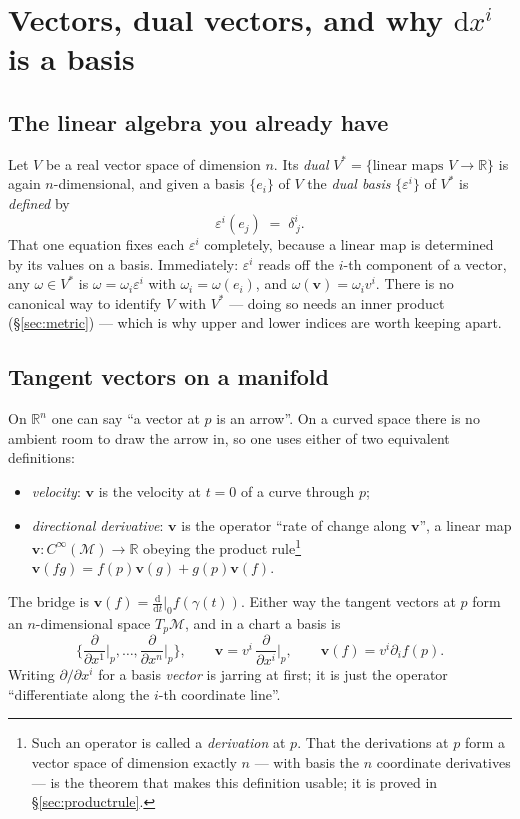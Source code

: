 \documentclass[10pt,a4paper]{article}
\newcommand{\dd}{\mathrm{d}}
\newcommand{\R}{\mathbb{R}}
\newcommand{\M}{\mathcal{M}}
\newcommand{\pdi}[1]{\frac{\partial}{\partial #1}}
\newcommand{\vv}{\mathbf{v}}
\theoremstyle{plain}
\theoremstyle{definition}
\numberwithin{equation}{section}
\begin{document}
\section{Vectors, dual vectors, and why $\dd x^i$ is a basis}
\label{sec:dual}

\subsection{The linear algebra you already have}

Let $V$ be a real vector space of dimension $n$. Its \emph{dual}
$V^*=\{\text{linear maps }V\to\R\}$ is again $n$-dimensional, and given a basis $\{e_i\}$ of
$V$ the \emph{dual basis} $\{\varepsilon^i\}$ of $V^*$ is \emph{defined} by
\begin{equation}
\varepsilon^i(e_j)\;=\;\delta^i_{\,j}.
\label{eq:dualbasis}
\end{equation}
That one equation fixes each $\varepsilon^i$ completely, because a linear map is determined by
its values on a basis. Immediately: $\varepsilon^i$ reads off the $i$-th component of a vector,
any $\omega\in V^*$ is $\omega=\omega_i\varepsilon^i$ with $\omega_i=\omega(e_i)$, and
$\omega(\vv)=\omega_iv^i$. There is no canonical way to identify $V$ with $V^*$ --- doing so
needs an inner product (\S\ref{sec:metric}) --- which is why upper and lower indices are worth
keeping apart.

\subsection{Tangent vectors on a manifold}

On $\R^n$ one can say ``a vector at $p$ is an arrow''. On a curved space there is no ambient
room to draw the arrow in, so one uses either of two equivalent definitions:
\begin{itemize}[leftmargin=1.3em,itemsep=1pt]
\item \emph{velocity}: $\vv$ is the velocity at $t=0$ of a curve through $p$;
\item \emph{directional derivative}: $\vv$ is the operator ``rate of change along $\vv$'',
      a linear map $\vv:C^\infty(\M)\to\R$ obeying the product
      rule\footnote{Such an operator is called a \emph{derivation} at $p$. That the derivations
      at $p$ form a vector space of dimension exactly $n$ --- with basis the $n$ coordinate
      derivatives --- is the theorem that makes this definition usable; it is proved in
      \S\ref{sec:productrule}.}
      $\vv(fg)=f(p)\vv(g)+g(p)\vv(f)$.
\end{itemize}
The bridge is $\vv(f)=\frac{\dd}{\dd t}\big|_0 f(\gamma(t))$. Either way the tangent vectors at
$p$ form an $n$-dimensional space $T_p\M$, and in a chart a basis is
\begin{equation}
\Big\{\pdi{x^1}\Big|_p,\dots,\pdi{x^n}\Big|_p\Big\},
\qquad \vv = v^i\,\pdi{x^i}\Big|_p, \qquad \vv(f)=v^i\partial_if(p).
\end{equation}
Writing $\partial/\partial x^i$ for a basis \emph{vector} is jarring at first; it is just the
operator ``differentiate along the $i$-th coordinate line''.
\end{document}
